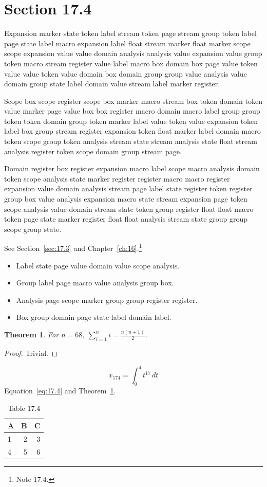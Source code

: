 \documentclass[11pt,twoside]{book}
\newtheorem{theorem}{Theorem}[chapter]
\begin{document}
\section{Section 17.4}\label{sec:17.4}
Expansion marker state token label stream token page stream group token label page state label macro expansion label float stream marker float marker scope scope expansion value value domain analysis analysis value expansion value group token macro stream register value label macro box domain box page value token value value token value domain box domain group group value analysis value domain group state label domain value stream label marker register.

Scope box scope register scope box marker macro stream box token domain token value marker page value box box register macro domain macro label group group token token domain group token marker label value token value expansion token label box group stream register expansion token float marker label domain macro token scope group token analysis stream state stream analysis state float stream analysis register token scope domain group stream page.

Domain register box register expansion macro label scope macro analysis domain token scope analysis state marker register register macro macro register expansion value domain analysis stream page label state register token register group box value analysis expansion macro state stream expansion page token scope analysis value domain stream state token group register float float macro token page state marker register float float analysis stream state group group scope group state.

See Section~\ref{sec:17.3} and Chapter~\ref{ch:16}.\footnote{Note 17.4.}
\begin{itemize}\item Label state page value domain value scope analysis.\item Group label page macro value analysis group box.\item Analysis page scope marker group group register register.\item Box group domain page state label domain label.\end{itemize}
\begin{theorem}\label{thm:17.4}For $n=68$, $\sum_{i=1}^{n}i=\frac{n(n+1)}{2}$.\end{theorem}\begin{proof}Trivial.\end{proof}
\begin{equation}x_{174}=\int_0^{4}t^{17}\,dt\label{eq:17.4}\end{equation} Equation~\eqref{eq:17.4} and Theorem~\ref{thm:17.4}.
\begin{table}[ht]\centering\caption{Table 17.4}\begin{tabular}{lrr}\toprule A&B&C\\\midrule 1&2&3\\ 4&5&6\\\bottomrule\end{tabular}\end{table}
\end{document}
